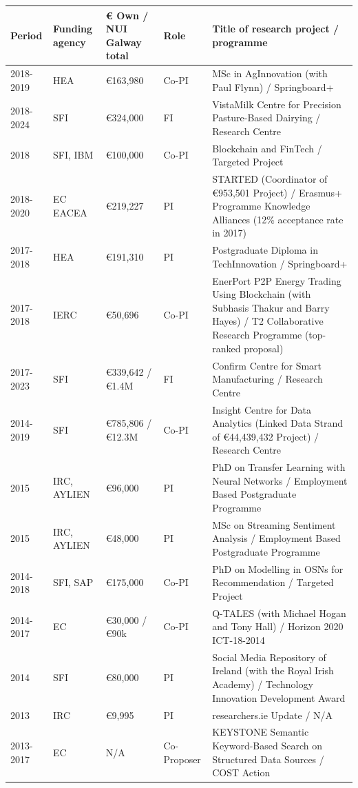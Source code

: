 \documentclass[10pt,a4paper]{res} %
\begin{document}
\begin{resume}
\begin{longtable}{ p{2 cm} | p{2 cm} | p{2 cm} | p{2 cm} | p{7 cm} }
Period & Funding agency & \euro{} Own / NUI Galway total & Role & Title of research project / programme \\
\hline
2018-2019 & HEA & \euro{}163,980 & Co-PI & MSc in AgInnovation (with Paul Flynn) / Springboard+ \\
2018-2024 & SFI & \euro{}324,000 & FI & VistaMilk Centre for Precision Pasture-Based Dairying / Research Centre \\
2018 & SFI, IBM & \euro{}100,000 & Co-PI & Blockchain and FinTech / Targeted Project \\
2018-2020 & EC EACEA & \euro{}219,227 & PI & STARTED (Coordinator of \euro{}953,501 Project) / Erasmus+ Programme Knowledge Alliances (12\% acceptance rate in 2017) \\
2017-2018 & HEA & \euro{}191,310 & PI & Postgraduate Diploma in TechInnovation / Springboard+ \\
2017-2018 & IERC & \euro{}50,696 & Co-PI & EnerPort P2P Energy Trading Using Blockchain (with Subhasis Thakur and Barry Hayes) / T2 Collaborative Research Programme (top-ranked proposal) \\
2017-2023 & SFI & \euro{}339,642 / \euro{}1.4M & FI & Confirm Centre for Smart Manufacturing / Research Centre \\
2014-2019 & SFI & \euro{}785,806 / \euro{}12.3M & Co-PI & Insight Centre for Data Analytics (Linked Data Strand of \euro{}44,439,432 Project) / Research Centre \\
2015 & IRC, AYLIEN & \euro{}96,000 & PI & PhD on Transfer Learning with Neural Networks / Employment Based Postgraduate Programme \\
2015 & IRC, AYLIEN & \euro{}48,000 & PI & MSc on Streaming Sentiment Analysis / Employment Based Postgraduate Programme \\
2014-2018 & SFI, SAP & \euro{}175,000 & Co-PI & PhD on Modelling in OSNs for Recommendation / Targeted Project \\
2014-2017 & EC & \euro{}30,000 / \euro{}90k & Co-PI & Q-TALES (with Michael Hogan and Tony Hall) / Horizon 2020 ICT-18-2014 \\
2014 & SFI & \euro{}80,000 & PI & Social Media Repository of Ireland (with the Royal Irish Academy) / Technology Innovation Development Award \\
2013 & IRC & \euro{}9,995 & PI & researchers.ie Update / N/A \\
2013-2017 & EC & N/A & Co-Proposer & KEYSTONE Semantic Keyword-Based Search on Structured Data Sources / COST Action \\

\end{longtable}
\end{resume}
\end{document}
